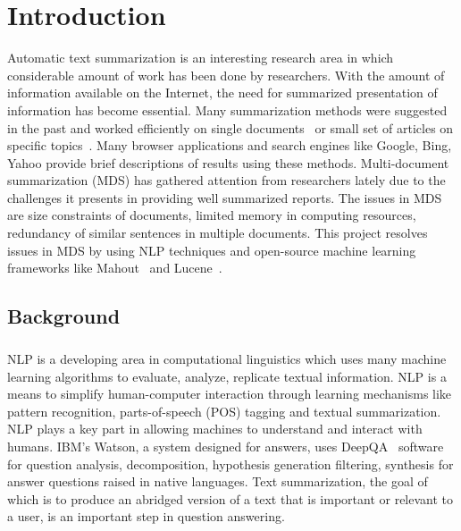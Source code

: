 \chapter{Introduction}


Automatic text summarization is an interesting research area in which considerable amount of work
has been done by researchers. With the amount of information available on the Internet, the need for summarized
presentation of information has become essential. Many summarization methods were suggested in the past and worked
efficiently on single documents~\cite{Luhn:1958} or small set of articles on specific topics~\cite{Harabagiu:2005}. Many browser
applications and search engines like Google, Bing, Yahoo provide brief descriptions of results using these methods.\newline\newline
Multi-document summarization (MDS) has gathered attention from researchers lately due  to the challenges it presents
in providing well summarized reports.  The issues in MDS are size constraints of documents,
limited memory in computing resources, redundancy of similar sentences in multiple documents.
This project resolves issues in MDS by using NLP techniques and open-source machine learning
frameworks like Mahout~\cite{mahout} and Lucene~\cite{lucene}. 

\section{Background}
\paragraph{}NLP is a developing area in computational linguistics which uses many machine learning algorithms to evaluate,
analyze, replicate textual information.  NLP is a means to simplify human-computer interaction through learning
mechanisms like pattern recognition, parts-of-speech (POS) tagging and textual summarization. NLP plays a key part in allowing
machines to understand and interact with humans. IBM's Watson, a system designed for answers, uses DeepQA~\cite{Ferrucci:2011} software for
question analysis, decomposition, hypothesis generation filtering, synthesis for answer questions raised in 
native languages. Text summarization, the goal of which is to produce an abridged version of a text that is
important or relevant to a user, is an important step in question answering.
